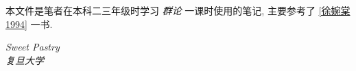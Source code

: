    本文件是笔者在本科二三年级时学习 \emph{群论} 一课时使用的笔记, 主要参考了 \ref{徐婉棠1994} 一书.

    \begin{flushright}
        \textit{Sweet Pastry} \\[1em]
        \textit{复旦大学}
    \end{flushright}